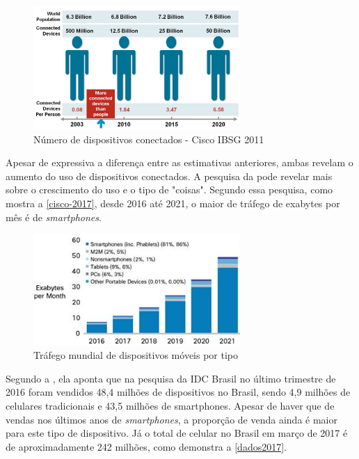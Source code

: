 \begin{figure}[htb]
  \caption{\label{cisco2011}Número de dispositivos conectados - Cisco IBSG 2011}
  \begin{center}
    \includegraphics[width=0.70\textwidth]{img/cisco-2011.png}
  \end{center}
\end{figure}

Apesar de expressiva a diferença entre as estimativas anteriores, ambas revelam o aumento do uso de dispositivos conectados.
A pesquisa da  pode revelar mais sobre o crescimento do uso e o tipo de "coisas". Segundo essa pesquisa,
como mostra a \autoref{cisco-2017}, desde
2016 até 2021, o maior de tráfego de exabytes por mês é de \emph{smartphones}.

\begin{figure}[htb]
  \caption{\label{cisco-2017}Tráfego mundial de dispositivos móveis por tipo}
  \begin{center}
    \includegraphics[width=0.70\textwidth]{img/cisco-2017.png}
  \end{center}
\end{figure}

Segundo a , ela aponta que na pesquisa da IDC Brasil
no último trimestre de 2016 foram vendidos 48,4 milhões de dispositivos no Brasil, sendo 4,9 milhões de celulares tradicionais e 43,5
milhões de smartphones. Apesar
de haver que de vendas nos últimos anos de \emph{smartphones}, a proporção de venda ainda é maior para este tipo de dispositivo. Já o total
de celular no Brasil em março de 2017 é de aproximadamente 242 milhões, como demonstra a \autoref{dados2017}.

